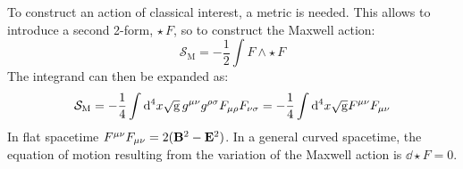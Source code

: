 To construct an action of classical interest, a metric is needed. This allows to introduce a second 2-form, $ \star\, F $, so to construct the Maxwell action:
\begin{equation}
  \mathcal{S}_{\text{M}} = - \frac{1}{2} \int F \wedge \star\, F
  \label{eq:maxwell-action}
\end{equation}
The integrand can then be expanded as:
\begin{equation*}
  \mathcal{S}_{\text{M}} = - \frac{1}{4} \int \mathrm{d}^4 x \sqrt{\mathrm{g}}\, g^{\mu \nu} g^{\rho \sigma} F_{\mu \rho} F_{\nu \sigma} = - \frac{1}{4} \int \mathrm{d}^4 x \sqrt{\mathrm{g}} F^{\mu \nu} F_{\mu \nu}
\end{equation*}
In flat spacetime $ F^{\mu \nu} F_{\mu \nu} = 2 (\mathbf{B}^2 - \mathbf{E}^2) $. In a general curved spacetime, the equation of motion resulting from the variation of the Maxwell action is $ \dd \star F = 0 $.

